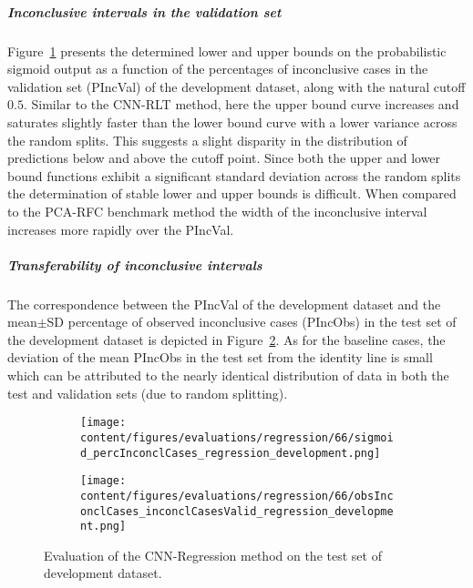 \subparagraph{Inconclusive intervals in the validation set}

Figure~\ref{fig:regression_percInconclCases_development} presents the determined lower and upper bounds on the 
probabilistic sigmoid output as a function of the percentages of inconclusive cases 
in the validation set (PIncVal) of the development dataset, along with the natural cutoff $0.5$.
Similar to the CNN-RLT method, 
here the upper bound curve increases and saturates slightly faster than the lower bound curve with a lower variance across 
the random splits.
This suggests a slight disparity in the distribution of predictions below and above the cutoff point.
Since both the upper and lower bound functions exhibit a significant standard deviation across the random splits 
the determination of stable lower and upper bounds is difficult.
When compared to the PCA-RFC benchmark method 
the width of the inconclusive interval increases more rapidly over the PIncVal.


\subparagraph{Transferability of inconclusive intervals}

The correspondence between the PIncVal of the development dataset 
and the mean$\pm$SD percentage of observed inconclusive cases (PIncObs) in the test set of the development dataset 
is depicted in Figure~\ref{fig:obsInconclCases_inconclCasesValid_regression_development}.
As for the baseline cases, the deviation of the mean PIncObs in the test set from the 
identity line is small which can be attributed to the nearly identical distribution of data in both the test and validation sets 
(due to random splitting).


\begin{figure}[ht]
  \begin{subfigure}{0.48\textwidth}
    \centering
    \texttt{[image: content/figures/evaluations/regression/66/sigmoid\_percInconclCases\_regression\_development.png]}
    \label{fig:regression_percInconclCases_development}
  \end{subfigure}
  \hfill
  \begin{subfigure}{0.495\textwidth}
    \centering
    \texttt{[image: content/figures/evaluations/regression/66/obsInconclCases\_inconclCasesValid\_regression\_development.png]}
    \label{fig:obsInconclCases_inconclCasesValid_regression_development}
  \end{subfigure}

  \caption{Evaluation of the CNN-Regression method on the test set of development dataset.}
  \label{fig:eval_cnn_regression_dev}
\end{figure}


